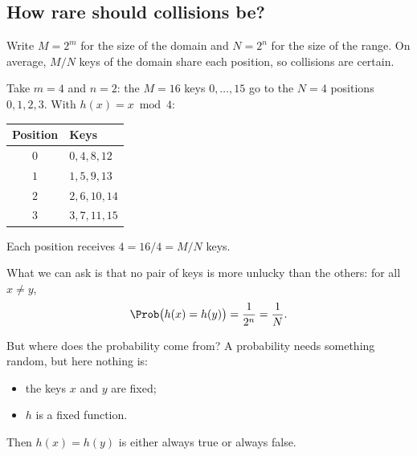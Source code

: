 \documentclass[a4paper,12pt,oneside]{report}
\begin{document}
\subsection{How rare should collisions be?}

Write $M=2^m$ for the size of the domain and $N=2^n$ for the size of
the range. On average, $M/N$ keys of the domain share each position,
so collisions are certain.

\begin{framedexample}{}
Take $m=4$ and $n=2$: the $M=16$ keys $0,\ldots,15$ go to the $N=4$
positions $0,1,2,3$. With $h(x)=x\bmod 4$:
\begin{center}
\begin{tabular}{cl}
\hline
Position & Keys \\
\hline
$0$ & $0,4,8,12$ \\
$1$ & $1,5,9,13$ \\
$2$ & $2,6,10,14$ \\
$3$ & $3,7,11,15$ \\
\hline
\end{tabular}
\end{center}
Each position receives $4=16/4=M/N$ keys.
\end{framedexample}

What we can ask is that no pair of keys
is more unlucky than the others: for all $x\neq y$,
\[
  \Prob\bigl(h(x)=h(y)\bigr)=\frac{1}{2^n}=\frac{1}{N}.
\]

\begin{center}
\end{center}

But where does the probability come from? A probability needs
something random, but here nothing is:
\begin{itemize}
  \item the keys $x$ and $y$ are fixed;
  \item $h$ is a fixed function.
\end{itemize}
Then $h(x)=h(y)$ is either always true or always false.
\end{document}
